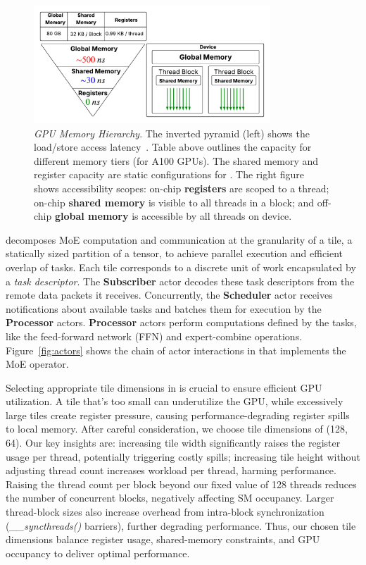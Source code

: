 \begin{figure}[!ht]
    \centering
    \includegraphics[width=3.5in]{figures/mem}
    \caption{\emph{GPU Memory Hierarchy}.
    The inverted pyramid (left) shows the load/store access latency~\cite{10579250, amperearch, ptx}. Table above outlines the capacity for different memory tiers (for A100 GPUs). The shared memory and register capacity are static configurations for \sysname.
    The right figure shows accessibility scopes: on-chip \textbf{registers}
    are scoped to a thread; on-chip \textbf{shared memory} is visible to all threads in a block;
    and off-chip \textbf{global memory} is accessible by all threads on device.}
    \label{fig:mem}
    \vspace{-3mm}
\end{figure}

\sysname decomposes MoE computation and communication at the granularity of a tile, a statically sized partition of a tensor, to achieve parallel execution and efficient overlap of tasks. Each tile corresponds to a discrete unit of work encapsulated by a \emph{task descriptor}. The \textbf{Subscriber} actor decodes these task descriptors from the remote data packets it receives. Concurrently, the \textbf{Scheduler} actor receives notifications about available tasks and batches them for execution by the \textbf{Processor} actors. \textbf{Processor} actors perform computations defined by the tasks, like the feed-forward network (FFN) and expert-combine operations. Figure~\ref{fig:actors} shows the chain of actor interactions in \sysname that implements the MoE operator.

Selecting appropriate tile dimensions in \sysname is crucial to ensure efficient GPU utilization. A tile that's too small can underutilize the GPU, while excessively large tiles create register pressure, causing performance-degrading register spills to local memory. After careful consideration, we choose tile dimensions of (128, 64). Our key insights are: increasing tile width significantly raises the register usage per thread, potentially triggering costly spills; increasing tile height without adjusting thread count increases workload per thread, harming performance. Raising the thread count per block beyond our fixed value of 128 threads reduces the number of concurrent blocks, negatively affecting SM occupancy. Larger thread-block sizes also increase overhead from intra-block synchronization (\emph{\_\_syncthreads()} barriers), further degrading performance. Thus, our chosen tile dimensions balance register usage, shared-memory constraints, and GPU occupancy to deliver optimal performance.

